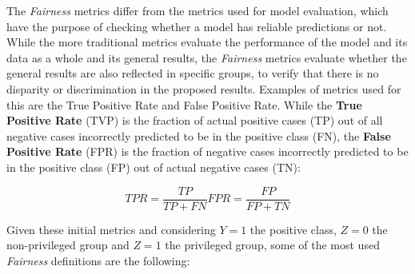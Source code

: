 \documentclass[runningheads]{llncs}
\begin{document}
The \textit{Fairness} metrics differ from the metrics used for model evaluation, which have the purpose of checking whether a model has reliable predictions or not. While the more traditional metrics evaluate the performance of the model and its data as a whole and its general results, the \textit{Fairness} metrics evaluate whether the general results are also reflected in specific groups, to verify that there is no disparity or discrimination in the proposed results. Examples of metrics used for this are the True Positive Rate and False Positive Rate. While the \textbf{True Positive Rate} (TVP) is the fraction of actual positive cases (TP) out of all negative cases incorrectly predicted to be in the positive class (FN), the \textbf{False Positive Rate} (FPR) is the fraction of negative cases incorrectly predicted to be in the positive class (FP) out of actual negative cases (TN):

\begin{equation}
TPR = \frac{TP}{TP + FN}
FPR = \frac{FP}{FP + TN}
\end{equation}

Given these initial metrics and considering $Y=1$ the positive class, $Z=0$ the non-privileged group and $Z=1$ the privileged group, some of the most used \textit{Fairness} definitions are the following:
\end{document}
